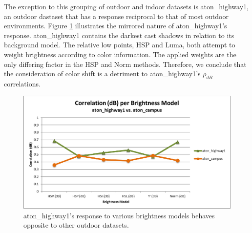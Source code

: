 The exception to this grouping of outdoor and indoor datasets is aton\_highway1, an outdoor dastaset that has a response reciprocal to that of most outdoor environments. Figure \ref{fig:highway1_reciprocal} illustrates the mirrored nature of aton\_highway1's response. 
aton\_highway1 contains the darkest cast shadows in relation to its background model. The relative low points, HSP and Luma, both attempt to weight brightness according to color information. The applied weights are the only differing factor in the HSP and Norm methods. Therefore, we conclude that the consideration of color shift is a detriment to aton\_highway1's $\rho_{dB}$ correlations.

\begin{figure}
\centering
  \includegraphics[width=1\linewidth]{figures/highway1_reciprocal.jpg}
\caption{aton\_highway1's response to various brightness models behaves opposite to other outdoor datasets.}
\label{fig:highway1_reciprocal}
\end{figure}

